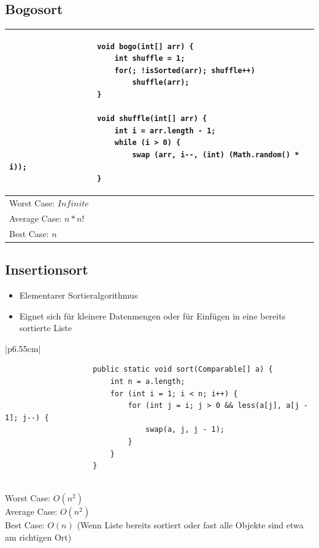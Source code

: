 \documentclass[a4paper, landscape, 8pt]{scrartcl}
\begin{document}
\begin{multicols*}{4}
            \subsection{Bogosort}
                \begin{tabular}{|p{6.55cm}|}
                    \hline
                    \begin{lstlisting}
                    void bogo(int[] arr) {
                        int shuffle = 1;
                        for(; !isSorted(arr); shuffle++)
                            shuffle(arr);
                    }

                    void shuffle(int[] arr) {
                        int i = arr.length - 1;
                        while (i > 0) {
                            swap (arr, i--, (int) (Math.random() * i));
                    }
                    \end{lstlisting} \\
                    \hline
                    Worst Case: $Infinite$ \\
                    Average Case: $n*n!$ \\
                    Best Case: $n$ \\
                    \hline
                \end{tabular}

            \subsection{Insertionsort}
                \begin{itemize}
                    \item Elementarer Sortieralgorithmus
                    \item Eignet sich für kleinere Datenmengen oder für Einfügen in eine bereits sortierte Liste
                \end{itemize}
                \begin{tabular}{|p{6.55cm}|}
                    \hline
                    \begin{lstlisting}
                    public static void sort(Comparable[] a) {
                        int n = a.length;
                        for (int i = 1; i < n; i++) {
                            for (int j = i; j > 0 && less(a[j], a[j - 1]; j--) {
                                swap(a, j, j - 1);
                            }
                        }
                    }
                    \end{lstlisting} \\
                    \hline
                    Worst Case: $O(n^2)$ \\
                    Average Case: $O(n^2)$ \\
                    Best Case: $O(n)$ (Wenn Liste bereits sortiert oder fast alle Objekte sind etwa am richtigen Ort)\\
                    \hline
                \end{tabular}

\end{multicols*}
\end{document}
